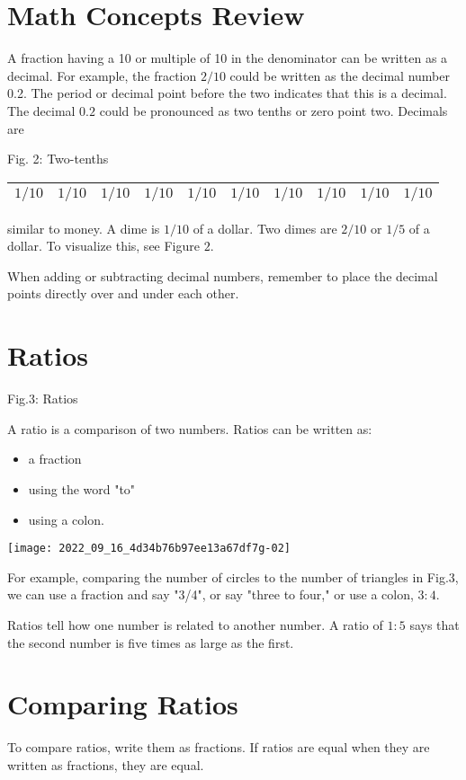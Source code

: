\begin{enumerate}
\section{Math Concepts Review}
A fraction having a 10 or multiple of 10 in the denominator can be written as a decimal. For example, the fraction $2 / 10$ could be written as the decimal number 0.2. The period or decimal point before the two indicates that this is a decimal. The decimal $0.2$ could be pronounced as two tenths or zero point two. Decimals are

Fig. 2: Two-tenths

\begin{tabular}{|l|l|l|l|l|l|l|l|l|l|}
\hline
$1 / 10$ & $1 / 10$ & $1 / 10$ & $1 / 10$ & $1 / 10$ & $1 / 10$ & $1 / 10$ & $1 / 10$ & $1 / 10$ & $1 / 10$ \\
\hline
\end{tabular}

similar to money. A dime is $1 / 10$ of a dollar. Two dimes are $2 / 10$ or $1 / 5$ of a dollar. To visualize this, see Figure $2 .$

When adding or subtracting decimal numbers, remember to place the decimal points directly over and under each other.

\section{Ratios}
Fig.3: Ratios

A ratio is a comparison of two numbers. Ratios can be written as:

\begin{itemize}
  \item a fraction

  \item using the word "to"

  \item using a colon.

\end{itemize}
\texttt{[image: 2022\_09\_16\_4d34b76b97ee13a67df7g-02]}

For example, comparing the number of circles to the number of triangles in Fig.3, we can use a fraction and say "3/4", or say "three to four," or use a colon, $3: 4$.

Ratios tell how one number is related to another number. A ratio of $1: 5$ says that the second number is five times as large as the first.

\section{Comparing Ratios}
To compare ratios, write them as fractions. If ratios are equal when they are written as fractions, they are equal.


\end{enumerate}
